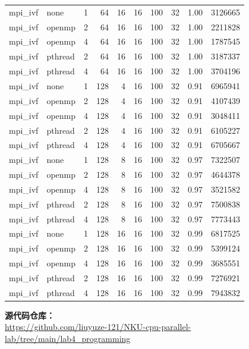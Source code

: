 \documentclass[a4paper]{article}
\begin{document}
{\begin{longtable}{lllrrrrrrr}
mpi\_ivf & none & 1 & 64 & 16 & 16 & 100 & 32 & 1.00 & 3126665 \\
mpi\_ivf & openmp & 2 & 64 & 16 & 16 & 100 & 32 & 1.00 & 2211828 \\
mpi\_ivf & openmp & 4 & 64 & 16 & 16 & 100 & 32 & 1.00 & 1787545 \\
mpi\_ivf & pthread & 2 & 64 & 16 & 16 & 100 & 32 & 1.00 & 3187337 \\
mpi\_ivf & pthread & 4 & 64 & 16 & 16 & 100 & 32 & 1.00 & 3704196 \\
mpi\_ivf & none & 1 & 128 & 4 & 16 & 100 & 32 & 0.91 & 6965941 \\
mpi\_ivf & openmp & 2 & 128 & 4 & 16 & 100 & 32 & 0.91 & 4107439 \\
mpi\_ivf & openmp & 4 & 128 & 4 & 16 & 100 & 32 & 0.91 & 3048411 \\
mpi\_ivf & pthread & 2 & 128 & 4 & 16 & 100 & 32 & 0.91 & 6105227 \\
mpi\_ivf & pthread & 4 & 128 & 4 & 16 & 100 & 32 & 0.91 & 6705667 \\
mpi\_ivf & none & 1 & 128 & 8 & 16 & 100 & 32 & 0.97 & 7322507 \\
mpi\_ivf & openmp & 2 & 128 & 8 & 16 & 100 & 32 & 0.97 & 4644378 \\
mpi\_ivf & openmp & 4 & 128 & 8 & 16 & 100 & 32 & 0.97 & 3521582 \\
mpi\_ivf & pthread & 2 & 128 & 8 & 16 & 100 & 32 & 0.97 & 7500838 \\
mpi\_ivf & pthread & 4 & 128 & 8 & 16 & 100 & 32 & 0.97 & 7773443 \\
mpi\_ivf & none & 1 & 128 & 16 & 16 & 100 & 32 & 0.99 & 6817525 \\
mpi\_ivf & openmp & 2 & 128 & 16 & 16 & 100 & 32 & 0.99 & 5399124 \\
mpi\_ivf & openmp & 4 & 128 & 16 & 16 & 100 & 32 & 0.99 & 3685551 \\
mpi\_ivf & pthread & 2 & 128 & 16 & 16 & 100 & 32 & 0.99 & 7276921 \\
mpi\_ivf & pthread & 4 & 128 & 16 & 16 & 100 & 32 & 0.99 & 7943832 \\
\bottomrule
\end{longtable}
}


\newpage



\vspace{1cm}
\noindent\textbf{\large 源代码仓库：}\\
\url{https://github.com/liuyuze-121/NKU-cpu-parallel-lab/tree/main/lab4_programming}
\end{document}

